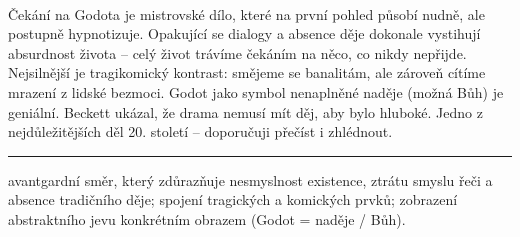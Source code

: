 \documentclass[FGBook.tex]{subfiles}
\begin{document}
\vspace*{2em}\\
\noindent Čekání na Godota je mistrovské dílo, které na první pohled působí nudně, ale postupně hypnotizuje. Opakující se dialogy a absence děje dokonale vystihují absurdnost života – celý život trávíme čekáním na něco, co nikdy nepřijde. Nejsilnější je tragikomický kontrast: smějeme se banalitám, ale zároveň cítíme mrazení z lidské bezmoci. Godot jako symbol nenaplněné naděje (možná Bůh) je geniální. Beckett ukázal, že drama nemusí mít děj, aby bylo hluboké. Jedno z nejdůležitějších děl 20. století – doporučuji přečíst i zhlédnout.

\vfill

\noindent\begin{minipage}{\textwidth}
    {\textcolor{\wpagecolor}{\rule{\linewidth}{0.4pt}}
    \footnotesize
     avantgardní směr, který zdůrazňuje nesmyslnost existence, ztrátu smyslu řeči a absence tradičního děje; 
     spojení tragických a komických prvků; 
     zobrazení abstraktního jevu konkrétním obrazem (Godot = naděje / Bůh).
    }
\end{minipage}

\newpage
\end{document}
